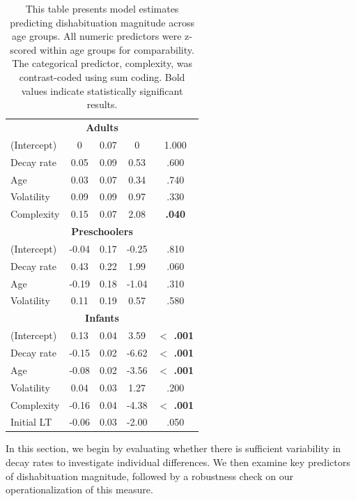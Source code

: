 \documentclass[10pt, letterpaper]{article}
\begin{document}
\begin{table}[t]
\begin{minipage}{0.48\textwidth}
\begin{tabular}{@{}lcccc@{}}
            \midrule
            \multicolumn{5}{c}{\textbf{Adults}} \\
            (Intercept) & 0 & 0.07 & 0 & 1.000 \\
           Decay rate  & 0.05 & 0.09 & 0.53 & .600 \\
            Age & 0.03 & 0.07 & 0.34 & .740 \\
            Volatility & 0.09 & 0.09 & 0.97 & .330 \\
            Complexity & 0.15 & 0.07 & 2.08 & \textbf{.040} \\
            \midrule
            \multicolumn{5}{c}{\textbf{Preschoolers}} \\
            (Intercept) & -0.04 & 0.17 & -0.25 & .810 \\
           Decay rate  & 0.43 & 0.22 & 1.99 & .060 \\
            Age & -0.19 & 0.18 & -1.04 & .310 \\
            Volatility & 0.11 & 0.19 & 0.57 & .580 \\
            \midrule
            \multicolumn{5}{c}{\textbf{Infants}} \\
            (Intercept) & 0.13 & 0.04 & 3.59 & \textbf{$<$ .001} \\
           Decay rate  & -0.15 & 0.02 & -6.62 & \textbf{$<$ .001} \\
            Age & -0.08 & 0.02 & -3.56 & \textbf{$<$ .001} \\
            Volatility & 0.04 & 0.03 & 1.27 & .200 \\
            Complexity & -0.16 & 0.04 & -4.38 & \textbf{$<$ .001} \\
            Initial LT & -0.06 & 0.03 & -2.00 & .050 \\
            \bottomrule
        \end{tabular}
    \end{minipage}
    \caption{\label{demo-table}This table presents model estimates predicting dishabituation magnitude across age groups. All numeric predictors were z-scored within age groups for comparability. The categorical predictor, complexity, was contrast-coded using sum coding. Bold values indicate statistically significant results.}
\end{table}

In this section, we begin by evaluating whether there is sufficient
variability in decay rates to investigate individual differences. We
then examine key predictors of dishabituation magnitude, followed by a
robustness check on our operationalization of this measure.
\end{document}

